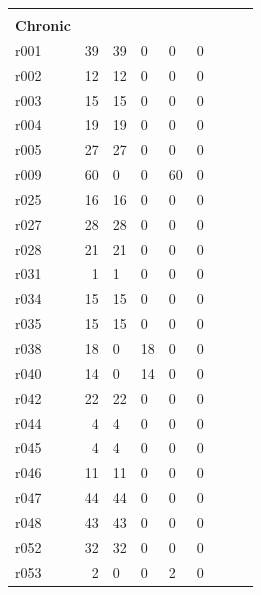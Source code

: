 \documentclass[10pt]{article}
\begin{document}
\begin{table}[h]
\begin{tabular}{lrlllllll}
& & & & & \\
 \textbf{Chronic}  & & & & & \\
\arrayrulecolor{black!30}\midrule
r001 & 39 & 39 & 0 & 0 & 0 \\
r002 & 12 & 12 & 0 & 0 & 0 \\
r003 & 15 & 15 & 0 & 0 & 0 \\
r004 & 19 & 19 & 0 & 0 & 0 \\
r005 & 27 & 27 & 0 & 0 & 0 \\
r009 & 60 & 0 & 0 & 60 & 0 \\
r025 & 16 & 16 & 0 & 0 & 0 \\
r027 & 28 & 28 & 0 & 0 & 0 \\
r028 & 21 & 21 & 0 & 0 & 0 \\
r031 & 1 & 1 & 0 & 0 & 0 \\
r034 & 15 & 15 & 0 & 0 & 0 \\
r035 & 15 & 15 & 0 & 0 & 0 \\
r038 & 18 & 0 & 18 & 0 & 0 \\
r040 & 14 & 0 & 14 & 0 & 0 \\
r042 & 22 & 22 & 0 & 0 & 0 \\
r044 & 4 & 4 & 0 & 0 & 0 \\
r045 & 4 & 4 & 0 & 0 & 0 \\
r046 & 11 & 11 & 0 & 0 & 0 \\
r047 & 44 & 44 & 0 & 0 & 0 \\
r048 & 43 & 43 & 0 & 0 & 0 \\
r052 & 32 & 32 & 0 & 0 & 0 \\
r053 & 2 & 0 & 0 & 2 & 0 \\
\bottomrule
\end{tabular}
\end{table}
\end{document}
